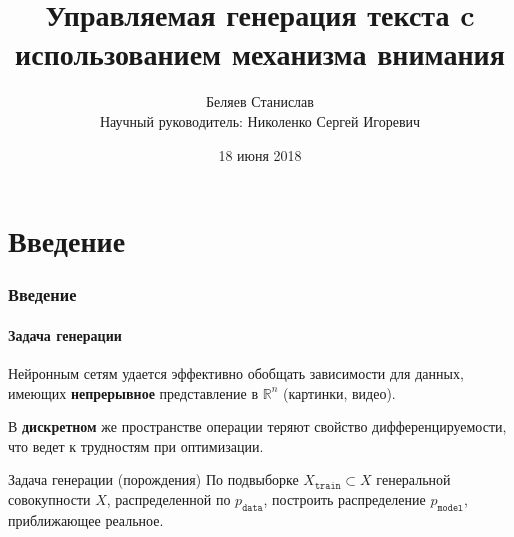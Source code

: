 \documentclass[10pt]{beamer}
\title[Управляемая генерация текста]{Управляемая генерация текста c использованием механизма внимания
}
\author[Беляев Станислав]{
Беляев Станислав\texorpdfstring{\\ Научный руководитель: Николенко Сергей Игоревич}{}
}
\institute[СПбАУ]
{
Санкт-Петербургский Академический Университет
}
\date{18 июня 2018}
\begin{document}
\begin{frame}


\titlepage
\end{frame}
\section{Введение}
\begin{frame}
\frametitle{Введение}
\framesubtitle{Задача генерации}


Нейронным сетям удается эффективно обобщать зависимости для данных, имеющих \textbf{непрерывное} представление в $\mathbb{R}^n$ (картинки, видео). 

В \textbf{дискретном} же пространстве операции теряют свойство дифференцируемости, что ведет к трудностям при оптимизации.

\vskip-1mm

\begin{block}{Задача генерации (порождения)}
    По подвыборке $X_{\texttt{train}} \subset X$ генеральной совокупности $X$, распределенной по $p_{\texttt{data}}$, построить распределение $p_{\texttt{model}}$, приближающее реальное.
\end{block}


\end{frame}
\end{document}
